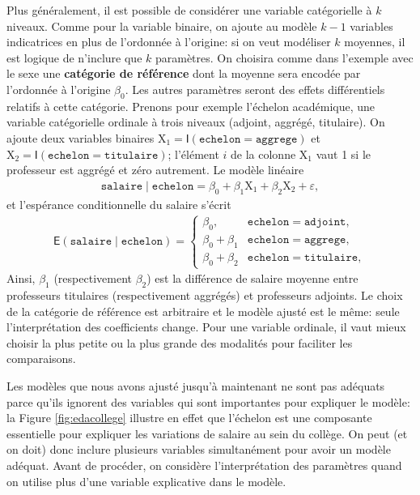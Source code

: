 \documentclass[
  11pt,
  letterpaper,
]{article}
\theoremstyle{definition}
\theoremstyle{definition}
\theoremstyle{definition}
\theoremstyle{definition}
\theoremstyle{remark}
\begin{document}
Plus généralement, il est possible de considérer une variable catégorielle à \(k\) niveaux. Comme pour la variable binaire, on ajoute au modèle \(k-1\) variables indicatrices en plus de l'ordonnée à l'origine: si on veut modéliser \(k\) moyennes, il est logique de n'inclure que \(k\) paramètres. On choisira comme dans l'exemple avec le sexe une \textbf{catégorie de référence} dont la moyenne sera encodée par l'ordonnée à l'origine \(\beta_0\). Les autres paramètres seront des effets différentiels relatifs à cette catégorie. Prenons pour exemple l'échelon académique, une variable catégorielle ordinale à trois niveaux (adjoint, aggrégé, titulaire). On ajoute deux variables binaires \(\mathrm{X}_1 = \mathsf{I}(\texttt{echelon}=\texttt{aggrege})\) et \(\mathrm{X}_2 = \mathsf{I}(\texttt{echelon}=\texttt{titulaire})\); l'élément \(i\) de la colonne \(\mathrm{X}_1\) vaut 1 si le professeur est aggrégé et zéro autrement. Le modèle linéaire
\begin{align*}
\texttt{salaire} \mid \texttt{echelon}=\beta_0 + \beta_1 \mathrm{X}_1+\beta_2\mathrm{X}_2 + \varepsilon,
\end{align*}
et l'espérance conditionnelle du salaire s'écrit
\begin{align*}
\mathsf{E}(\texttt{salaire} \mid \texttt{echelon})= \begin{cases}
\beta_0, & \texttt{echelon}=\texttt{adjoint},\\
\beta_0 + \beta_1 & \texttt{echelon}=\texttt{aggrege},\\
\beta_0 + \beta_2 & \texttt{echelon}=\texttt{titulaire},
\end{cases}
\end{align*}
Ainsi, \(\beta_1\) (respectivement \(\beta_2\)) est la différence de salaire moyenne entre professeurs titulaires (respectivement aggrégés) et professeurs adjoints.
Le choix de la catégorie de référence est arbitraire et le modèle ajusté est le même: seule l'interprétation des coefficients change. Pour une variable ordinale, il vaut mieux choisir la plus petite ou la plus grande des modalités pour faciliter les comparaisons.

Les modèles que nous avons ajusté jusqu'à maintenant ne sont pas adéquats parce qu'ils ignorent des variables qui sont importantes pour expliquer le modèle: la Figure \ref{fig:edacollege} illustre en effet que l'échelon est une composante essentielle pour expliquer les variations de salaire au sein du collège. On peut (et on doit) donc inclure plusieurs variables simultanément pour avoir un modèle adéquat. Avant de procéder, on considère l'interprétation des paramètres quand on utilise plus d'une variable explicative dans le modèle.
\end{document}
